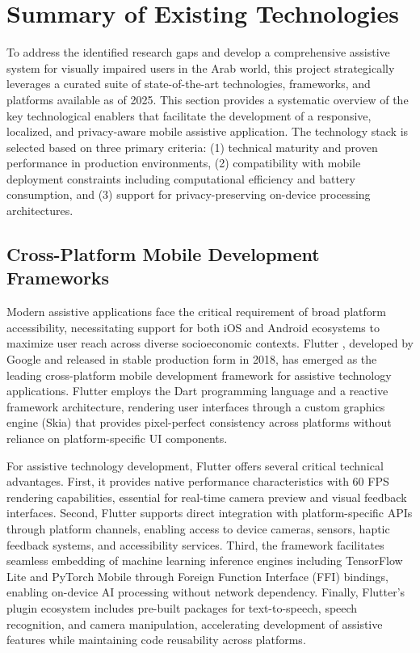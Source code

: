\documentclass[a4paper]{report}
\begin{document}
\section{Summary of Existing Technologies}
\label{sec:existing-tech}

To address the identified research gaps and develop a comprehensive assistive system for visually impaired users in the Arab world, this project strategically leverages a curated suite of state-of-the-art technologies, frameworks, and platforms available as of 2025. This section provides a systematic overview of the key technological enablers that facilitate the development of a responsive, localized, and privacy-aware mobile assistive application. The technology stack is selected based on three primary criteria: (1) technical maturity and proven performance in production environments, (2) compatibility with mobile deployment constraints including computational efficiency and battery consumption, and (3) support for privacy-preserving on-device processing architectures.

\subsection{Cross-Platform Mobile Development Frameworks}
\label{subsec:mobile-frameworks}

Modern assistive applications face the critical requirement of broad platform accessibility, necessitating support for both iOS and Android ecosystems to maximize user reach across diverse socioeconomic contexts. Flutter \cite{flutter_framework}, developed by Google and released in stable production form in 2018, has emerged as the leading cross-platform mobile development framework for assistive technology applications. Flutter employs the Dart programming language and a reactive framework architecture, rendering user interfaces through a custom graphics engine (Skia) that provides pixel-perfect consistency across platforms without reliance on platform-specific UI components.

For assistive technology development, Flutter offers several critical technical advantages. First, it provides native performance characteristics with 60 FPS rendering capabilities, essential for real-time camera preview and visual feedback interfaces. Second, Flutter supports direct integration with platform-specific APIs through platform channels, enabling access to device cameras, sensors, haptic feedback systems, and accessibility services. Third, the framework facilitates seamless embedding of machine learning inference engines including TensorFlow Lite \cite{tensorflow_lite} and PyTorch Mobile \cite{pytorch_mobile} through Foreign Function Interface (FFI) bindings, enabling on-device AI processing without network dependency. Finally, Flutter's plugin ecosystem includes pre-built packages for text-to-speech, speech recognition, and camera manipulation, accelerating development of assistive features while maintaining code reusability across platforms.
\end{document}

